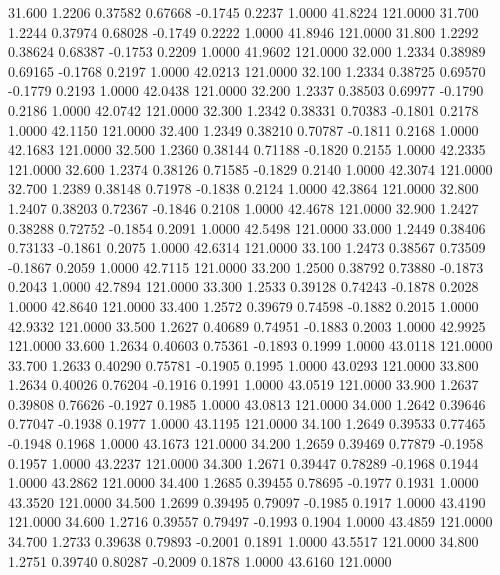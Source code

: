   31.600   1.2206   0.37582   0.67668  -0.1745   0.2237   1.0000  41.8224 121.0000
  31.700   1.2244   0.37974   0.68028  -0.1749   0.2222   1.0000  41.8946 121.0000
  31.800   1.2292   0.38624   0.68387  -0.1753   0.2209   1.0000  41.9602 121.0000
  32.000   1.2334   0.38989   0.69165  -0.1768   0.2197   1.0000  42.0213 121.0000
  32.100   1.2334   0.38725   0.69570  -0.1779   0.2193   1.0000  42.0438 121.0000
  32.200   1.2337   0.38503   0.69977  -0.1790   0.2186   1.0000  42.0742 121.0000
  32.300   1.2342   0.38331   0.70383  -0.1801   0.2178   1.0000  42.1150 121.0000
  32.400   1.2349   0.38210   0.70787  -0.1811   0.2168   1.0000  42.1683 121.0000
  32.500   1.2360   0.38144   0.71188  -0.1820   0.2155   1.0000  42.2335 121.0000
  32.600   1.2374   0.38126   0.71585  -0.1829   0.2140   1.0000  42.3074 121.0000
  32.700   1.2389   0.38148   0.71978  -0.1838   0.2124   1.0000  42.3864 121.0000
  32.800   1.2407   0.38203   0.72367  -0.1846   0.2108   1.0000  42.4678 121.0000
  32.900   1.2427   0.38288   0.72752  -0.1854   0.2091   1.0000  42.5498 121.0000
  33.000   1.2449   0.38406   0.73133  -0.1861   0.2075   1.0000  42.6314 121.0000
  33.100   1.2473   0.38567   0.73509  -0.1867   0.2059   1.0000  42.7115 121.0000
  33.200   1.2500   0.38792   0.73880  -0.1873   0.2043   1.0000  42.7894 121.0000
  33.300   1.2533   0.39128   0.74243  -0.1878   0.2028   1.0000  42.8640 121.0000
  33.400   1.2572   0.39679   0.74598  -0.1882   0.2015   1.0000  42.9332 121.0000
  33.500   1.2627   0.40689   0.74951  -0.1883   0.2003   1.0000  42.9925 121.0000
  33.600   1.2634   0.40603   0.75361  -0.1893   0.1999   1.0000  43.0118 121.0000
  33.700   1.2633   0.40290   0.75781  -0.1905   0.1995   1.0000  43.0293 121.0000
  33.800   1.2634   0.40026   0.76204  -0.1916   0.1991   1.0000  43.0519 121.0000
  33.900   1.2637   0.39808   0.76626  -0.1927   0.1985   1.0000  43.0813 121.0000
  34.000   1.2642   0.39646   0.77047  -0.1938   0.1977   1.0000  43.1195 121.0000
  34.100   1.2649   0.39533   0.77465  -0.1948   0.1968   1.0000  43.1673 121.0000
  34.200   1.2659   0.39469   0.77879  -0.1958   0.1957   1.0000  43.2237 121.0000
  34.300   1.2671   0.39447   0.78289  -0.1968   0.1944   1.0000  43.2862 121.0000
  34.400   1.2685   0.39455   0.78695  -0.1977   0.1931   1.0000  43.3520 121.0000
  34.500   1.2699   0.39495   0.79097  -0.1985   0.1917   1.0000  43.4190 121.0000
  34.600   1.2716   0.39557   0.79497  -0.1993   0.1904   1.0000  43.4859 121.0000
  34.700   1.2733   0.39638   0.79893  -0.2001   0.1891   1.0000  43.5517 121.0000
  34.800   1.2751   0.39740   0.80287  -0.2009   0.1878   1.0000  43.6160 121.0000
